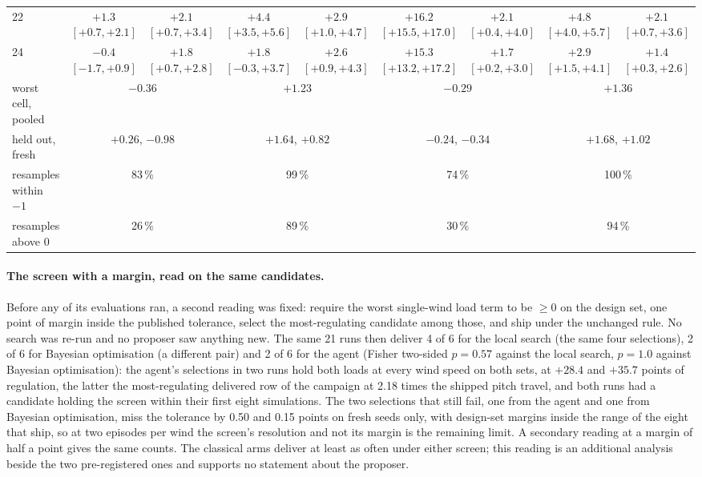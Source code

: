 \documentclass{article}
\begin{document}
\begin{table}[t]
{\begin{tabular}{lcccccccc}
22 & $+1.3$ {\scriptsize$[+0.7,+2.1]$} & $+2.1$ {\scriptsize$[+0.7,+3.4]$} & $+4.4$ {\scriptsize$[+3.5,+5.6]$} & $+2.9$ {\scriptsize$[+1.0,+4.7]$} & $+16.2$ {\scriptsize$[+15.5,+17.0]$} & $+2.1$ {\scriptsize$[+0.4,+4.0]$} & $+4.8$ {\scriptsize$[+4.0,+5.7]$} & $+2.1$ {\scriptsize$[+0.7,+3.6]$} \\
24 & $-0.4$ {\scriptsize$[-1.7,+0.9]$} & $+1.8$ {\scriptsize$[+0.7,+2.8]$} & $+1.8$ {\scriptsize$[-0.3,+3.7]$} & $+2.6$ {\scriptsize$[+0.9,+4.3]$} & $+15.3$ {\scriptsize$[+13.2,+17.2]$} & $+1.7$ {\scriptsize$[+0.2,+3.0]$} & $+2.9$ {\scriptsize$[+1.5,+4.1]$} & $+1.4$ {\scriptsize$[+0.3,+2.6]$} \\
\midrule
worst cell, pooled & \multicolumn{2}{c}{$-0.36$} & \multicolumn{2}{c}{$+1.23$} & \multicolumn{2}{c}{$-0.29$} & \multicolumn{2}{c}{$+1.36$} \\
held out, fresh & \multicolumn{2}{c}{$+0.26$, $-0.98$} & \multicolumn{2}{c}{$+1.64$, $+0.82$} & \multicolumn{2}{c}{$-0.24$, $-0.34$} & \multicolumn{2}{c}{$+1.68$, $+1.02$} \\
resamples within $-1$ & \multicolumn{2}{c}{83\,\%} & \multicolumn{2}{c}{99\,\%} & \multicolumn{2}{c}{74\,\%} & \multicolumn{2}{c}{100\,\%} \\
resamples above 0 & \multicolumn{2}{c}{26\,\%} & \multicolumn{2}{c}{89\,\%} & \multicolumn{2}{c}{30\,\%} & \multicolumn{2}{c}{94\,\%} \\
\bottomrule
\end{tabular}}
\end{table}

\paragraph{The screen with a margin, read on the same candidates.} Before any of its evaluations ran, a second reading was fixed: require the worst single-wind load term to be $\ge 0$ on the design set, one point of margin inside the published tolerance, select the most-regulating candidate among those, and ship under the unchanged rule. No search was re-run and no proposer saw anything new. The same 21 runs then deliver 4 of 6 for the local search (the same four selections), 2 of 6 for Bayesian optimisation (a different pair) and 2 of 6 for the agent (Fisher two-sided $p = 0.57$ against the local search, $p = 1.0$ against Bayesian optimisation): the agent's selections in two runs hold both loads at every wind speed on both sets, at $+28.4$ and $+35.7$ points of regulation, the latter the most-regulating delivered row of the campaign at 2.18 times the shipped pitch travel, and both runs had a candidate holding the screen within their first eight simulations. The two selections that still fail, one from the agent and one from Bayesian optimisation, miss the tolerance by 0.50 and 0.15 points on fresh seeds only, with design-set margins inside the range of the eight that ship, so at two episodes per wind the screen's resolution and not its margin is the remaining limit. A secondary reading at a margin of half a point gives the same counts. The classical arms deliver at least as often under either screen; this reading is an additional analysis beside the two pre-registered ones and supports no statement about the proposer.
\end{document}
